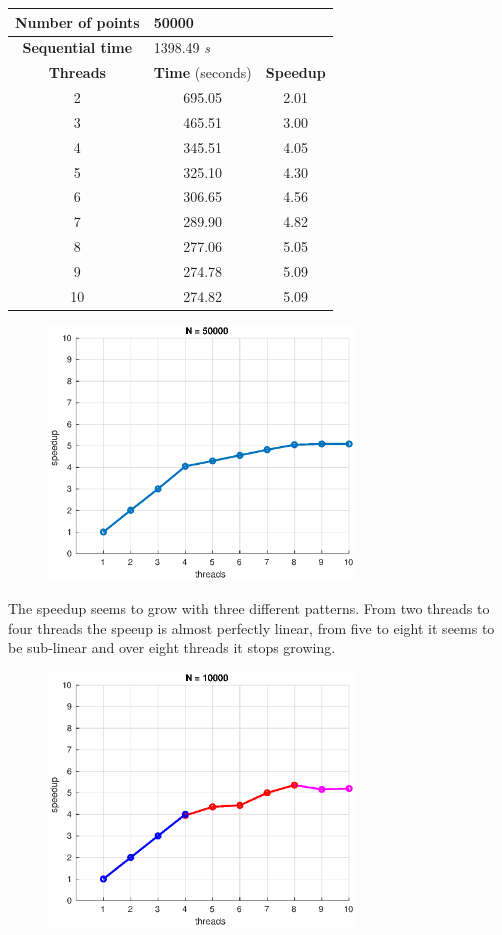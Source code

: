 \documentclass[10pt,twocolumn,letterpaper]{article}
\begin{document}
\begin{table}[H]
\centering
\begin{tabular}{ccc}
\hline
\textbf{Number of points} & \multicolumn{2}{l}{50000} \\ 
\hline
\textbf{Sequential time} & \multicolumn{2}{l}{1398.49 \textit{s}} \\
\hline
\textbf{Threads} & \textbf{Time} (seconds) & \textbf{Speedup} \\
\hline
2 & 695.05 & 2.01 \\
3 & 465.51 & 3.00 \\
4 & 345.51 & 4.05 \\
5 & 325.10 & 4.30 \\
6 & 306.65 & 4.56 \\
7 & 289.90 & 4.82 \\
8 & 277.06 & 5.05 \\
9 & 274.78 & 5.09 \\
10 & 274.82 & 5.09 \\
\hline
\end{tabular}
\end{table}

\begin{figure}[H]
\centering
\includegraphics[width=3.2in]{fig/speedup50000.eps}

\end{figure}
The speedup seems to grow with three different patterns. From two threads to four threads the speeup is almost perfectly linear, from five to eight it seems to be sub-linear and over eight threads it stops growing.

\begin{figure}[H]
\centering
\includegraphics[width=3.2in]{fig/speedup10000Colors.eps}
\end{figure}
\end{document}
